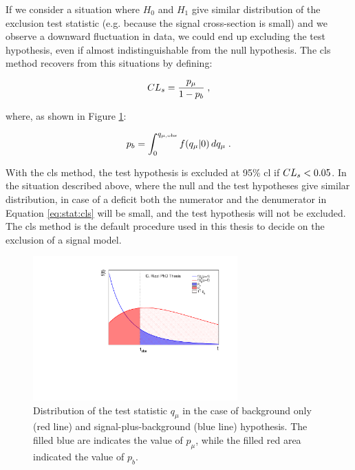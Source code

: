 If we consider a situation where $H_0$ and $H_1$ give similar distribution of the exclusion test statistic (e.g. because the signal cross-section is
small) and we observe a downward fluctuation in data, we could end up excluding the test hypothesis, even if almost indistinguishable from the null hypothesis. The \gls{cls} method \cite{JUNK1999435} recovers from this situations by defining:

\begin{equation}
\label{eq:stat:cls}
CL_s = \dfrac{p_\mu}{1 - p_b} \; , 
\end{equation}

\noindent where, as shown in Figure \ref{fig:stat:pmu_pb}:

\begin{equation}
\label{eq:stat:pb}
p_b = \int_{0}^{q_{\mu,{\rm obs}}} f(q_{\mu} | 0 ) \,
d q_{\mu}  \; .
\end{equation}

With the \gls{cls} method, the test hypothesis is excluded at 95\% \gls{cl} if $CL_s < 0.05$. In the situation described above, where the null and the test hypotheses give similar \qmu distribution, in case of a deficit both the numerator and the denumerator in Equation \ref{eq:stat:cls} will be small, and the test hypothesis will not be excluded. The \gls{cls} method is the default procedure used in this thesis to decide on the exclusion of a signal model. 


\begin{figure}
\centering
\includegraphics[width=0.7\textwidth]{produce_plots/stat/pmu_pb.pdf}
\caption{Distribution of the test statistic $q_\mu$ in the case of background only (red line) and signal-plus-background (blue line) hypothesis. The filled blue are indicates the value of $p_\mu$, while the filled red area indicated the value of $p_b$.}
\label{fig:stat:pmu_pb}
\end{figure}

